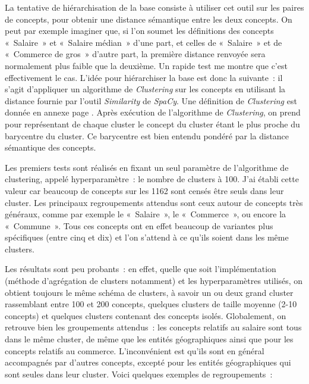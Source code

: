 La tentative de hiérarchisation de la base consiste à utiliser cet outil sur les paires de concepts, pour obtenir une distance sémantique entre les deux concepts. On peut par exemple imaginer que, si l'on soumet les définitions des concepts «~Salaire~» et «~Salaire médian~» d'une part, et celles de «~Salaire~» et de «~Commerce de gros~» d'autre part, la première distance renvoyée sera normalement plus faible que la deuxième. Un rapide test me montre que c'est effectivement le cas. L'idée pour hiérarchiser la base est donc la suivante~: il s'agit d'appliquer un algorithme de \textit{Clustering} sur les concepts en utilisant la distance fournie par l'outil \textit{Similarity} de \textit{SpaCy}. Une définition de \textit{Clustering} est donnée en annexe page \pageref{clustering}. Après exécution de l'algorithme de \textit{Clustering}, on prend pour représentant de chaque cluster le concept du cluster étant le plus proche du barycentre du cluster. Ce barycentre est bien entendu pondéré par la distance sémantique des concepts.
\newline

Les premiers tests sont réalisés en fixant un seul paramètre de l'algorithme de clustering, appelé hyperparamètre~: le nombre de clusters à 100. J'ai établi cette valeur car beaucoup de concepts sur les 1162 sont censés être seuls dans leur cluster. Les principaux regroupements attendus sont ceux autour de concepts très généraux, comme par exemple le «~Salaire~», le «~Commerce~», ou encore la «~Commune~». Tous ces concepts ont en effet beaucoup de variantes plus spécifiques (entre cinq et dix) et l'on s'attend à ce qu'ils soient dans les même clusters.
\newline

Les résultats sont peu probants~: en effet, quelle que soit l'implémentation (méthode d'agrégation de clusters notamment) et les hyperparamètres utilisés, on obtient toujours le même schéma de clusters, à savoir un ou deux grand cluster rassemblant entre 100 et 200 concepts, quelques clusters de taille moyenne (2-10 concepts) et quelques clusters contenant des concepts isolés. Globalement, on retrouve bien les groupements attendus~: les concepts relatifs au salaire sont tous dans le même cluster, de même que les entités géographiques ainsi que pour les concepts relatifs au commerce. L'inconvénient est qu'ils sont en général accompagnés par d'autres concepts, excepté pour les entités géographiques qui sont seules dans leur cluster. Voici quelques exemples de regroupements~:
\newline

